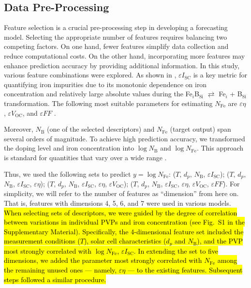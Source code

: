 \documentclass[a4paper,fleqn,draft]{cas-sc}
\begin{document}
\subsection{Data Pre-Processing}

Feature selection is a crucial pre-processing step in developing a forecasting model.
Selecting the appropriate number of features requires balancing two competing factors.
On one hand, fewer features simplify data collection and reduce computational costs.
On the other hand, incorporating more features may enhance prediction accuracy by providing additional information.
In this study, various feature combinations were explored.
As shown in \cite{Olikh2025MSEB}, $\varepsilon I_\mathrm{SC}$ is a key metric for quantifying iron impurities
due to its monotonic dependence on iron concentration and relatively large absolute values during the
Fe$_i$B$_\mathrm{Si}$ $\rightleftarrows$ Fe$_i$ + B$_\mathrm{Si}$
transformation.
The following most suitable parameters for estimating $N_\mathrm{Fe}$ are
$\varepsilon \eta$, $\varepsilon V_\mathrm{OC}$, and $\varepsilon F\!F$ \cite{Olikh2025MSEB}.

Moreover, $N_\mathrm{B}$ (one of the selected descriptors) and
$N_\mathrm{Fe}$ (target output) span several orders of magnitude.
To achieve high prediction accuracy, we transformed the doping level and iron concentration into
$\log N_\mathrm{B}$ and $\log N_\mathrm{Fe}$.
This approach is standard for quantities that vary over a wide range \cite{Srivastava2023, Minagawa2024}.

Thus, we used the following sets to predict $y = \log N_\mathrm{Fe}$:
($T$, $d_p$, $N_\mathrm{B}$, $\varepsilon I_\mathrm{SC}$);
($T$, $d_p$, $N_\mathrm{B}$, $\varepsilon I_\mathrm{SC}$, $\varepsilon \eta$);
($T$, $d_p$, $N_\mathrm{B}$, $\varepsilon I_\mathrm{SC}$, $\varepsilon \eta$, $\varepsilon V_\mathrm{OC}$);
($T$, $d_p$, $N_\mathrm{B}$, $\varepsilon I_\mathrm{SC}$, $\varepsilon \eta$, $\varepsilon V_\mathrm{OC}$, $\varepsilon F\!F$).
For simplicity, we will refer to the number of features as ``dimension'' from here on.
That is, features with dimensions 4, 5, 6, and 7 were used in various models.
\textcolor[rgb]{1.00,0.07,0.00}{
\hl{
When selecting sets of descriptors, we were guided by the degree of correlation between variations in individual PVPs and iron concentration
(see Fig.~S1 in the Supplementary Material).
Specifically, the 4-dimensional feature set included the measurement conditions ($T$),
solar cell characteristics ($d_p$ and $N_\mathrm{B}$), and the PVP most strongly correlated with $\log N_\mathrm{Fe}$, $\varepsilon I_\mathrm{SC}$.
In extending the set to five dimensions, we added the parameter most strongly correlated with $N_\mathrm{Fe}$
among the remaining unused ones --- namely,  $\varepsilon \eta$  --- to the existing features.
Subsequent steps followed a similar procedure.
}}
\end{document}
